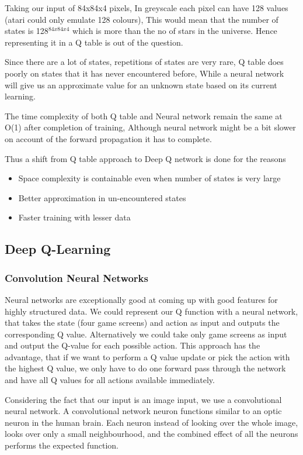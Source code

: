 \documentclass[a4paper,11pt]{report}
\begin{document}
				Taking our input of 84x84x4 pixels, In greyscale each pixel can have 128 values (atari could only emulate 128 colours), This would mean that the number of states is 128$^{84x84x4}$ which is more than the no of stars in the universe. Hence representing it in a Q table is out of the question.

				Since there are a lot of states, repetitions of states are very rare, Q table does poorly on states that it has never encountered before, While a neural network will give us an approximate value for an unknown state based on its current learning. 

				The time complexity of both Q table and Neural network remain the same at O(1) after completion of training, Although neural network might be a bit slower on account of the forward propagation it has to complete.


				Thus a shift from Q table approach to Deep Q network is done for the reasons
				\begin{itemize}
				\item Space complexity is containable even when number of states is very large
				\item Better approximation in un-encountered states
				\item Faster training with lesser data
				\end{itemize}
			\subsection{Deep Q-Learning}
				\subsubsection{Convolution Neural Networks}
					Neural networks are exceptionally good at coming up with good features for highly structured data. We could represent our Q function with a neural network, that takes the state (four game screens) and action as input and outputs the corresponding Q value. Alternatively we could take only game screens as input and output the Q-value for each possible action. This approach has the advantage, that if we want to perform a Q value update or pick the action with the highest Q value, we only have to do one forward pass through the network and have all Q values for all actions available immediately.

					Considering the fact that our input is an image input, we use a convolutional neural network. A convolutional network neuron functions similar to an optic neuron in the human brain. Each neuron instead of looking over the whole image, looks over only a small neighbourhood, and the combined effect of all the neurons performs the expected function.
\end{document}

